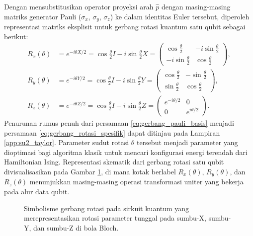 Dengan mensubstitusikan operator proyeksi arah $\hat{p}$ dengan masing-masing matriks generator Pauli ($\sigma_x$, $\sigma_y$, $\sigma_z$) ke dalam identitas Euler tersebut, diperoleh representasi matriks eksplisit untuk gerbang rotasi kuantum satu qubit sebagai berikut:
\begin{equation}
\label{eq:gerbang_rotasi_spesifik}
\begin{split}
    R_x(\theta) &= e^{-i \theta X/2} = \cos\frac{\theta}{2} I - i\sin\frac{\theta}{2} X = \begin{pmatrix} \cos\frac{\theta}{2} & -i\sin\frac{\theta}{2} \\ -i\sin\frac{\theta}{2} & \cos\frac{\theta}{2} \end{pmatrix},\\
    R_y(\theta) &= e^{-i \theta Y/2} = \cos\frac{\theta}{2} I - i\sin\frac{\theta}{2} Y = \begin{pmatrix} \cos\frac{\theta}{2} & -\sin\frac{\theta}{2} \\ \sin\frac{\theta}{2} & \cos\frac{\theta}{2} \end{pmatrix}, \\
    R_z(\theta) &= e^{-i \theta Z/2} = \cos\frac{\theta}{2} I - i\sin\frac{\theta}{2} Z = \begin{pmatrix} e^{-i\theta/2} & 0 \\ 0 & e^{i\theta/2} \end{pmatrix}.
\end{split}
\end{equation}
Penurunan rumus penuh dari persamaan \eqref{eq:gerbang_pauli_basis} menjadi persamaan \eqref{eq:gerbang_rotasi_spesifik} dapat ditinjau pada Lampiran \ref{app:su2_taylor}. Parameter sudut rotasi $\theta$ tersebut menjadi parameter yang dioptimasi bagi algoritma klasik untuk mencari konfigurasi energi terendah dari Hamiltonian Ising. Representasi skematik dari gerbang rotasi satu qubit divisualisasikan pada Gambar \ref{fig:gerbang_rotasi}, di mana kotak berlabel $R_x(\theta)$, $R_y(\theta)$, dan $R_z(\theta)$ menunjukkan masing-masing operasi transformasi uniter yang bekerja pada alur data qubit.
\begin{figure}[htbp]
    \centering
    \caption{Simbolisme gerbang rotasi pada sirkuit kuantum yang merepresentasikan rotasi parameter tunggal pada sumbu-X, sumbu-Y, dan sumbu-Z di bola Bloch.}
    \label{fig:gerbang_rotasi}
\end{figure}